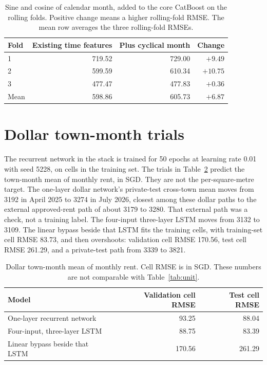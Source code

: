 \documentclass[11pt,a4paper]{article}
\begin{document}
\begin{table}[htbp]
\centering
\caption{Sine and cosine of calendar month, added to the core CatBoost on the rolling folds.
Positive change means a higher rolling-fold RMSE.
The mean row averages the three rolling-fold RMSEs.}
\label{tab:cyclic}
\small
\begin{tabular}{lrrr}
\toprule
Fold & Existing time features & Plus cyclical month & Change \\
\midrule
1 & 719.52 & 729.00 & $+9.49$ \\
2 & 599.59 & 610.34 & $+10.75$ \\
3 & 477.47 & 477.83 & $+0.36$ \\
\midrule
Mean & 598.86 & 605.73 & $+6.87$ \\
\bottomrule
\end{tabular}
\end{table}

\section{Dollar town-month trials}
\label{app:dollar}

The recurrent network in the stack is trained for 50 epochs at learning rate 0.01 with seed 5228, on cells in the training set.
The trials in Table~\ref{tab:dollar} predict the town-month mean of monthly rent, in SGD.
They are not the per-square-metre target.
The one-layer dollar network's private-test cross-town mean moves from 3192 in April 2025 to 3274 in July 2026, closest among these dollar paths to the external approved-rent path of about 3179 to 3280.
That external path was a check, not a training label.
The four-input three-layer LSTM moves from 3132 to 3109.
The linear bypass beside that LSTM fits the training cells, with training-set cell RMSE 83.73, and then overshoots: validation cell RMSE 170.56, test cell RMSE 261.29, and a private-test path from 3339 to 3821.

\begin{table}[htbp]
\centering
\caption{Dollar town-month mean of monthly rent.
Cell RMSE is in SGD.
These numbers are not comparable with Table~\ref{tab:unit}.}
\label{tab:dollar}
\small
\begin{tabular}{lrr}
\toprule
Model & Validation cell RMSE & Test cell RMSE \\
\midrule
One-layer recurrent network & 93.25 & 88.04 \\
Four-input, three-layer LSTM & 88.75 & 83.39 \\
Linear bypass beside that LSTM & 170.56 & 261.29 \\
\bottomrule
\end{tabular}
\end{table}
\end{document}
